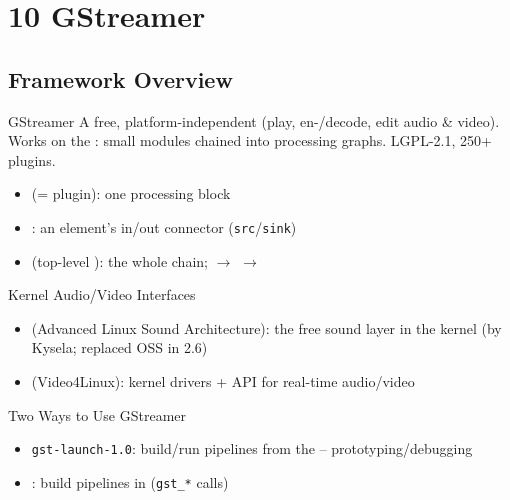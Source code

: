 \section{10 GStreamer}

\subsection{Framework Overview}


\begin{concept}{GStreamer}
    A free, platform-independent  (play, en-/decode,
    edit audio \& video). Works on the : small modules
    chained into processing graphs. LGPL-2.1, 250+ plugins.
    \begin{itemize}
        \item {} (= plugin): one processing block
        \item {}: an element's in/out connector (\texttt{src}/\texttt{sink})
        \item {} (top-level ): the whole chain;
               $\to$  $\to$ 
    \end{itemize}
\end{concept}


\begin{definition}{Kernel Audio/Video Interfaces}
    \begin{itemize}
        \item {} (Advanced Linux Sound Architecture): the free sound
              layer in the kernel (by Kysela; replaced OSS in 2.6)
        \item {} (Video4Linux): kernel drivers + API for real-time
              audio/video
    \end{itemize}
\end{definition}

\begin{definition}{Two Ways to Use GStreamer}
    \begin{itemize}
        \item \texttt{gst-launch-1.0}: build/run pipelines from the
               -- prototyping/debugging
        \item {}: build pipelines in 
              (\texttt{gst\_*} calls)
    \end{itemize}
\end{definition}

